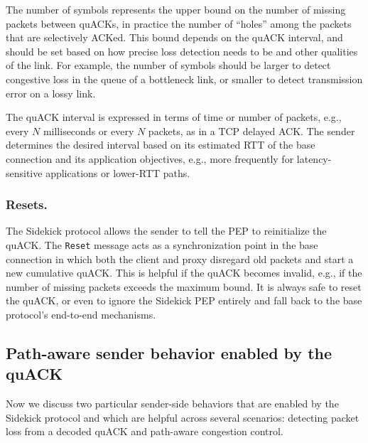 The number of symbols represents the upper bound on the number of missing
packets between quACKs, in practice the number of ``holes'' among the packets
that are selectively ACKed. This bound depends on the quACK interval, and
should be set based on how precise loss detection needs to be and other
qualities of the link. For example, the number of symbols should be larger to
detect congestive loss in the queue of a bottleneck link, or smaller to detect
transmission error on a lossy link.

The quACK interval is expressed in terms of time or number of packets,
 e.g., every $N$ milliseconds or every $N$ packets, as in a TCP delayed ACK.
The sender determines the desired interval based on its estimated
RTT of the base connection and its application objectives, e.g.,
more frequently for latency-sensitive applications or lower-RTT paths.

\subsubsection{Resets.}
The Sidekick protocol allows the sender to tell the PEP to reinitialize the
quACK. The \texttt{Reset} message acts as a synchronization point in the base
connection in which both the client and proxy disregard old packets and start
a new cumulative quACK. This is helpful if the quACK becomes invalid, e.g.,
if the number of missing packets exceeds the maximum bound. It is always safe
to reset the quACK, or even to ignore the Sidekick PEP entirely and fall back to the
base protocol's end-to-end mechanisms.


\subsection{Path-aware sender behavior enabled by the quACK}
\label{sec:sidekick:design:sender}

Now we discuss two particular sender-side behaviors that are enabled by the
Sidekick protocol and which are helpful across several scenarios: detecting
packet loss from a decoded quACK and path-aware congestion control.


